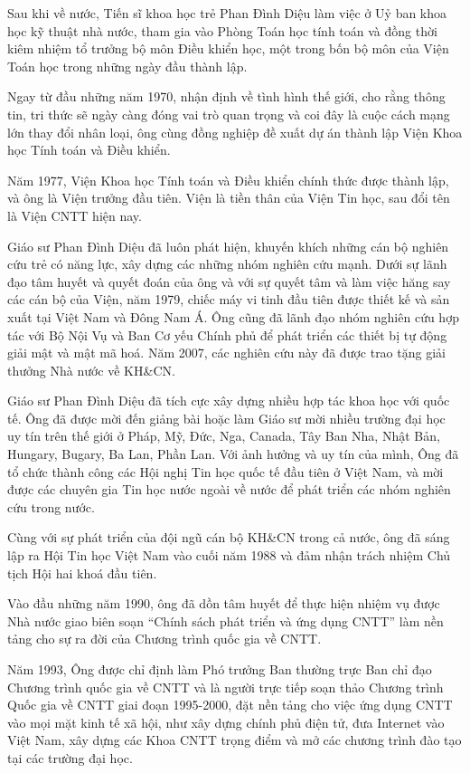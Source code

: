 Sau khi về nước, Tiến sĩ khoa học trẻ Phan Đình Diệu làm việc ở Uỷ ban khoa học kỹ thuật nhà nước, tham gia vào Phòng Toán học tính toán và đồng thời kiêm nhiệm tổ trưởng bộ môn Điều khiển học, một trong bốn bộ môn của Viện Toán học trong những ngày đầu thành lập. 

Ngay từ đầu những năm 1970, nhận định về tình hình thế giới, cho rằng thông tin, tri thức sẽ ngày càng đóng vai trò quan trọng và coi đây là cuộc cách mạng lớn thay đổi nhân loại, ông cùng đồng nghiệp đề xuất dự án thành lập Viện Khoa học Tính toán và Điều khiển. 

Năm 1977, Viện Khoa học Tính toán và Điều khiển chính thức được thành lập, và ông là Viện trưởng đầu tiên. Viện là tiền thân của Viện Tin học, sau đổi tên là Viện CNTT hiện nay. 

Giáo sư Phan Đình Diệu đã luôn phát hiện, khuyến khích những cán bộ nghiên cứu trẻ có năng lực, xây dựng các những nhóm nghiên cứu mạnh. Dưới sự lãnh đạo tâm huyết và quyết đoán của ông và với sự quyết tâm và làm việc hăng say các cán bộ của Viện, năm 1979, chiếc máy vi tinh đầu tiên được thiết kế và sản xuất tại Việt Nam và Đông Nam Á. Ông cũng đã lãnh đạo nhóm nghiên cứu hợp tác với Bộ Nội Vụ và Ban Cơ yếu Chính phủ để phát triển các thiết bị tự động giải mật và mật mã hoá. Năm 2007, các nghiên cứu này đã được trao tặng giải thưởng Nhà nước về KH\&CN.

Giáo sư Phan Đình Diệu đã tích cực xây dựng nhiều hợp tác khoa học với quốc tế. Ông đã được mời đến giảng bài hoặc làm Giáo sư mời nhiều trường đại học uy tín trên thế giới ở Pháp, Mỹ, Đức, Nga, Canada, Tây Ban Nha, Nhật Bản, Hungary, Bugary, Ba Lan, Phần Lan. Với ảnh hưởng và uy tín của mình, Ông đã tổ chức thành công các Hội nghị Tin học quốc tế đầu tiên ở Việt Nam, và mời được các chuyên gia Tin học nước ngoài về nước để phát triển các nhóm nghiên cứu trong nước. 

Cùng với sự phát triển của đội ngũ cán bộ KH\&CN trong cả nước, ông đã sáng lập ra Hội Tin học Việt Nam vào cuối năm 1988 và đảm nhận trách nhiệm Chủ tịch Hội hai khoá đầu tiên. 

Vào đầu những năm 1990, ông đã dồn tâm huyết để thực hiện nhiệm vụ được Nhà nước giao biên soạn ``Chính sách phát triển và ứng dụng CNTT'' làm nền tảng cho sự ra đời của Chương trình quốc gia về CNTT. 

Năm 1993, Ông được chỉ định làm Phó trưởng Ban thường trực Ban chỉ đạo Chương trình quốc gia về CNTT và là người trực tiếp soạn thảo Chương trình Quốc gia về CNTT giai đoạn 1995-2000, đặt nền tảng cho việc ứng dụng CNTT vào mọi mặt kinh tế xã hội, như xây dựng chính phủ điện tử, đưa Internet vào Việt Nam, xây dựng các Khoa CNTT trọng điểm và mở các chương trình đào tạo tại các trường đại học.

